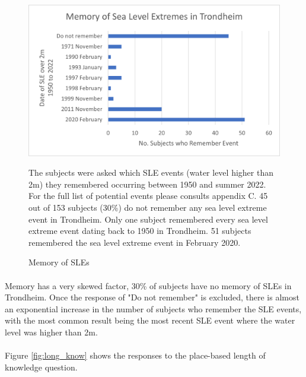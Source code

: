 \begin{figure}[H]
    \centering
    \includegraphics{fig_results/memory-sle.png}
    \caption{Memory of SLEs}{ The subjects were asked which SLE events (water level higher than 2m) they remembered occurring between 1950 and summer 2022. For the full list of potential events please consults appendix C. 45 out of 153 subjects (30\%) do not remember any sea level extreme event in Trondheim. Only one subject remembered every sea level extreme event dating back to 1950 in Trondheim. 51 subjects remembered the sea level extreme event in February 2020. }
    \label{fig:memory_sle}
\end{figure}
\paragraph{}

Memory has a very skewed factor, 30\% of subjects have no memory of SLEs in Trondheim. Once the response of "Do not remember" is excluded, there is almost an exponential increase in the number of subjects who remember the SLE events, with the most common result being the most recent SLE event where the water level was higher than 2m.  
\paragraph{}
Figure \ref{fig:long_know} shows the responses to the place-based length of knowledge question.

